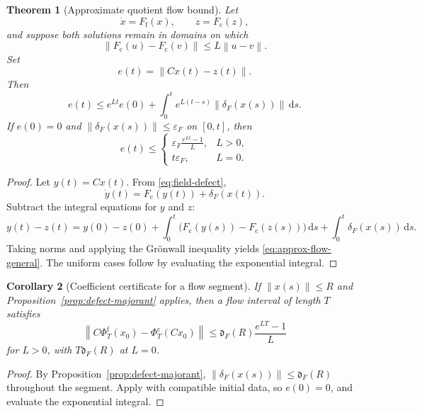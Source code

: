 \documentclass[11pt]{article}
\newtheorem{theorem}{Theorem}[section]
\newtheorem{corollary}[theorem]{Corollary}
\theoremstyle{definition}
\theoremstyle{remark}
\newcommand{\dd}{\,\mathrm d}
\newcommand{\norm}[1]{\left\lVert #1\right\rVert}
\newcommand{\fine}{\mathrm f}
\newcommand{\coarse}{\mathrm c}
\begin{document}
\begin{theorem}[Approximate quotient flow bound]\label{thm:approx-flow-bound}
Let
\[
  \dot x=F_{\fine}(x),
  \qquad
  \dot z=F_{\coarse}(z),
\]
and suppose both solutions remain in domains on which
\[
  \norm{F_{\coarse}(u)-F_{\coarse}(v)}
  \leq L\norm{u-v}.
\]
Set
\[
  e(t)=\norm{Cx(t)-z(t)}.
\]
Then
\begin{equation}\label{eq:approx-flow-general}
  \boxed{
  e(t)
  \leq
  e^{Lt}e(0)
  +
  \int_0^t e^{L(t-s)}\norm{\delta_F(x(s))}\dd s.}
\end{equation}
If $e(0)=0$ and $\norm{\delta_F(x(s))}\leq\varepsilon_F$ on $[0,t]$, then
\begin{equation}\label{eq:approx-flow-uniform}
  e(t)
  \leq
  \begin{cases}
  \displaystyle
  \varepsilon_F\frac{e^{Lt}-1}{L},&L>0,\\[1.1ex]
  t\varepsilon_F,&L=0.
  \end{cases}
\end{equation}
\end{theorem}

\begin{proof}
Let $y(t)=Cx(t)$.  From \eqref{eq:field-defect},
\[
  \dot y(t)=F_{\coarse}(y(t))+\delta_F(x(t)).
\]
Subtract the integral equations for $y$ and $z$:
\[
  y(t)-z(t)
  =y(0)-z(0)
  +\int_0^t
  \bigl(F_{\coarse}(y(s))-F_{\coarse}(z(s))\bigr)\dd s
  +\int_0^t\delta_F(x(s))\dd s.
\]
Taking norms and applying the Grönwall inequality yields \eqref{eq:approx-flow-general}.  The uniform cases follow by evaluating the exponential integral.
\end{proof}

\begin{corollary}[Coefficient certificate for a flow segment]\label{cor:coefficient-flow-certificate}
If $\norm{x(s)}\leq R$ and Proposition~\ref{prop:defect-majorant} applies, then a flow interval of length $T$ satisfies
\[
  \norm{C\Phi_T^{\fine}(x_0)-\Phi_T^{\coarse}(Cx_0)}
  \leq
  \mathfrak d_F(R)\frac{e^{LT}-1}{L}
\]
for $L>0$, with $T\mathfrak d_F(R)$ at $L=0$.
\end{corollary}

\begin{proof}
By Proposition~\ref{prop:defect-majorant}, $\norm{\delta_F(x(s))}\leq\mathfrak d_F(R)$ throughout the segment.  Apply  with compatible initial data, so $e(0)=0$, and evaluate the exponential integral.
\end{proof}
\end{document}

